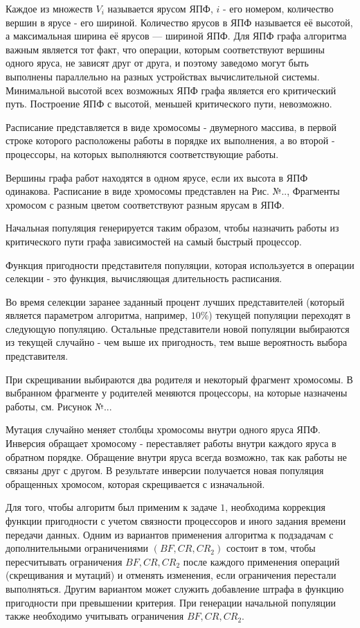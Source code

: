 \documentclass{article}
\begin{document}
Каждое из множеств $V_i$ называется ярусом ЯПФ, $i$ - его номером, количество вершин в ярусе - его шириной. Количество ярусов в ЯПФ называется её высотой, а максимальная ширина её ярусов — шириной ЯПФ. Для ЯПФ графа алгоритма важным является тот факт, что операции, которым соответствуют вершины одного яруса, не зависят друг от друга, и поэтому заведомо могут быть выполнены параллельно на разных устройствах вычислительной системы. Минимальной высотой всех возможных ЯПФ графа является его критический путь. Построение ЯПФ с высотой, меньшей критического пути, невозможно. \par
Расписание представляется в виде хромосомы - двумерного массива, в первой строке которого расположены работы в порядке их выполнения, а во второй - процессоры, на которых выполняются соответствующие работы. \par
Вершины графа работ находятся в одном ярусе, если их высота в ЯПФ одинакова. Расписание в виде хромосомы представлен на Рис. №.., Фрагменты хромосом с разным цветом соответствуют разным ярусам в ЯПФ. \par
Начальная популяция генерируется таким образом, чтобы назначить работы из критического пути графа зависимостей на самый быстрый процессор. \par
Функция пригодности представителя популяции, которая используется в операции селекции - это функция, вычисляющая длительность расписания. \par
Во время селекции заранее заданный процент лучших представителей (который является параметром алгоритма, например, $10\%$) текущей популяции переходят в следующую популяцию. Остальные представители новой популяции выбираются из текущей случайно - чем выше их пригодность, тем выше вероятность выбора представителя. \par
При скрещивании выбираются два родителя и некоторый фрагмент хромосомы. В выбранном фрагменте у родителей меняются процессоры, на которые назначены работы, см. Рисунок №... \par
Мутация случайно меняет столбцы хромосомы внутри одного яруса ЯПФ. Инверсия обращает хромосому - переставляет работы внутри каждого яруса в обратном порядке. Обращение внутри яруса всегда возможно, так как работы не связаны друг с другом. В результате инверсии получается новая популяция обращенных хромосом, которая скрещивается с изначальной. \par
Для того, чтобы алгоритм был применим к задаче $1$, необходима коррекция функции пригодности с учетом связности процессоров и иного задания времени передачи данных. Одним из вариантов применения алгоритма к подзадачам с дополнительными ограничениями $\left( BF, CR, CR_2 \right)$ состоит в том, чтобы пересчитывать ограничения $BF, CR, CR_2$ после каждого применения операций (скрещивания и мутаций) и отменять изменения, если ограничения перестали выполняться. Другим вариантом может служить добавление штрафа в функцию пригодности при превышении критерия. При генерации начальной популяции также необходимо учитывать ограничения $BF, CR, CR_2$. \par
\end{document}
